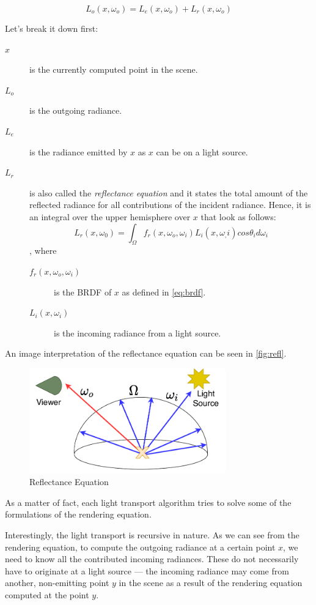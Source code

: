 \begin{equation}
L_o(x,\omega_o)=L_e(x,\omega_o)+L_r(x,\omega_o)
\end{equation}

Let's break it down first:
\begin{description}
	\item[$x$] is the currently computed point in the scene.
	\item[$L_o$] is the outgoing radiance.
	\item[$L_e$] is the radiance emitted by $x$ as $x$ can be on a light source.
	\item[$L_r$] is also called the \emph{reflectance equation} and it states the total amount of the reflected radiance for all contributions of the incident radiance. Hence, it is an integral over the upper hemisphere over $x$ that look as follows:
	\begin{equation}
	L_r(x,\omega_0)=\int_{\Omega}f_r(x,\omega_o,\omega_i) L_i(x,\omega_,i) cos\theta_i d\omega_i
	\end{equation}
	, where
	\begin{description}
		\item[$f_r(x,\omega_o,\omega_i)$] is the BRDF of $x$ as defined in \autoref{eq:brdf}.
		\item[$L_i(x,\omega_i)$] is the incoming radiance from a light source.
	\end{description}
\end{description}

An image interpretation of the reflectance equation can be seen in \autoref{fig:refl}.

\begin{figure}[h]
	\centering
	\includegraphics[width=85mm]{img/refl.pdf}
	\caption{Reflectance Equation}
	\label{fig:refl}
\end{figure}

As a matter of fact, each light transport algorithm tries to solve some of the formulations of the rendering equation.

Interestingly, the light transport is recursive in nature. As we can see from the rendering equation, to compute the outgoing radiance at a certain point $x$, we need to know all the contributed incoming radiances. These do not necessarily have to originate at a light source --- the incoming radiance may come from another, non-emitting point $y$ in the scene as a result of the rendering equation computed at the point $y$.


